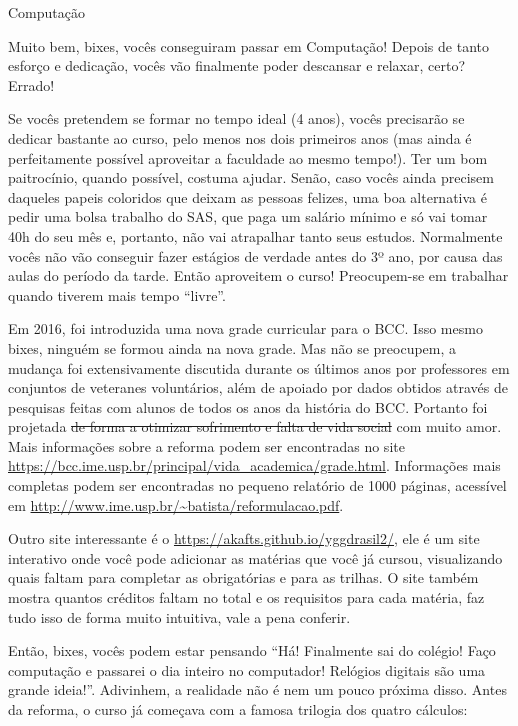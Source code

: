 \begin{subsecao}{Computação}

Muito bem, bixes, vocês conseguiram passar em Computação! Depois de tanto
esforço e dedicação, vocês vão finalmente poder descansar e relaxar, certo?
Errado!

Se vocês pretendem se formar no tempo ideal (4 anos), vocês precisarão se
dedicar bastante ao curso, pelo menos nos dois primeiros anos (mas ainda é
perfeitamente possível aproveitar a faculdade ao mesmo tempo!). Ter um bom
paitrocínio, quando possível, costuma ajudar. Senão, caso vocês ainda precisem
daqueles papeis coloridos que deixam as pessoas felizes, uma boa alternativa é
pedir uma bolsa trabalho do SAS, que paga um salário mínimo e só vai tomar
40h do seu mês e, portanto, não vai atrapalhar tanto seus estudos. Normalmente
vocês não vão conseguir fazer estágios de verdade antes do 3º ano, por causa
das aulas do período da tarde. Então aproveitem o curso! Preocupem-se em
trabalhar quando tiverem mais tempo ``livre''.

Em 2016, foi introduzida uma nova grade curricular para o
BCC. Isso mesmo bixes, ninguém se formou ainda na nova grade. Mas não se preocupem, a
mudança foi extensivamente discutida durante os últimos anos por professores em
conjuntos de veteranes voluntários, além de apoiado por dados obtidos através de
pesquisas feitas com alunos de todos os anos da história do BCC. Portanto foi
projetada \sout{de forma a otimizar sofrimento e falta de vida social} com muito
amor. Mais informações sobre a reforma podem ser encontradas no site
\url{https://bcc.ime.usp.br/principal/vida_academica/grade.html}. Informações mais completas podem ser
encontradas no pequeno relatório de 1000 páginas, acessível em
\url{http://www.ime.usp.br/~batista/reformulacao.pdf}.

Outro site interessante é o \url{https://akafts.github.io/yggdrasil2/}, ele é um site interativo onde você pode adicionar as matérias que você já cursou, visualizando quais faltam para completar as obrigatórias e para as trilhas. O site também mostra quantos créditos faltam no total e os requisitos para cada matéria, faz tudo isso de forma muito intuitiva, vale a pena conferir.

Então, bixes, vocês podem estar pensando ``Há! Finalmente sai do colégio! Faço
computação e passarei o dia inteiro no computador! Relógios digitais são uma
grande ideia!''. Adivinhem, a realidade não é nem um pouco próxima disso. Antes
da reforma, o curso já começava com a famosa trilogia dos quatro cálculos:


\end{subsecao}
